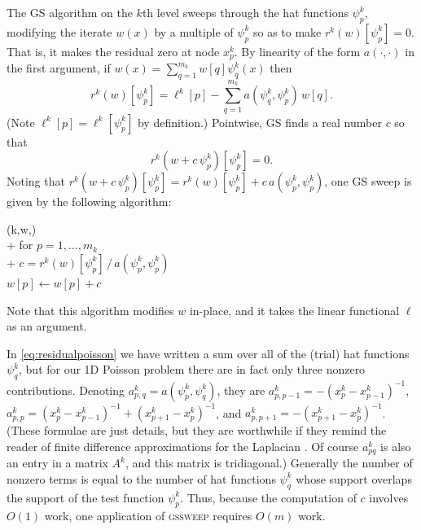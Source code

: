 \documentclass[letterpaper,final,12pt,reqno]{amsart}
\begin{document}
The GS algorithm on the $k$th level sweeps through the hat functions $\psi_p^k$, modifying the iterate $w(x)$ by a multiple of $\psi_p^k$ so as to make $r^k(w)[\psi_p^k]=0$.  That is, it makes the residual zero at node $x_p^k$.  By linearity of the form $a(\cdot,\cdot)$ in the first argument, if $w(x) = \sum_{q=1}^{m_k} w[q] \psi_q^k(x)$ then
\begin{equation}
  r^k(w)[\psi_p^k] = \ell^k[p] - \sum_{q=1}^{m_k} a(\psi_q^k,\psi_p^k)\, w[q].  \label{eq:residualpoisson}
\end{equation}
(Note $\ell^k[p] = \ell^k[\psi_p^k]$ by definition.)  Pointwise, GS finds a real number $c$ so that
\begin{equation}
  r^k(w+c\,\psi_p^k)[\psi_p^k] = 0.  \label{eq:gaussseidelpoint}
\end{equation}
Noting that $r^k(w+c\,\psi_p^k)[\psi_p^k] = r^k(w)[\psi_p^k] + c\, a(\psi_p^k,\psi_p^k)$, one GS sweep is given by the following algorithm:
\begin{pseudo*}
(k,w,\ell)\text{:} \\+
    for $p=1,\dots,m_k$ \\+
        $\displaystyle c = r^k(w)[\psi_p^k]\, \big/ \,a(\psi_p^k,\psi_p^k)$  \qquad {} \\
        $w[p] \gets w[p] + c$
\end{pseudo*}
Note that this algorithm modifies $w$ in-place, and it takes the linear functional $\ell$ as an argument.

In \eqref{eq:residualpoisson} we have written a sum over all of the (trial) hat functions $\psi_q^k$, but for our 1D Poisson problem there are in fact only three nonzero contributions.  Denoting $a_{p,q}^k = a(\psi_p^k,\psi_q^k)$, they are $a_{p,p-1}^k = -(x_p^k-x_{p-1}^k)^{-1}$, $a_{p,p}^k = (x_p^k-x_{p-1}^k)^{-1} + (x_{p+1}^k-x_p^k)^{-1}$, and $a_{p,p+1}^k = -(x_{p+1}^k-x_p^k)^{-1}$.  (These formulae are just details, but they are worthwhile if they remind the reader of finite difference approximations for the Laplacian \cite[for example]{Bueler2021}.  Of course $a_{pq}^k$ is also an entry in a matrix $A^k$, and this matrix is tridiagonal.)  Generally the number of nonzero terms is equal to the number of hat functions $\psi_q^k$ whose support overlaps the support of the test function $\psi_p^k$.  Thus, because the computation of $c$ involves $O(1)$ work, one application of \textsc{gssweep} requires $O(m)$ work.
\end{document}
